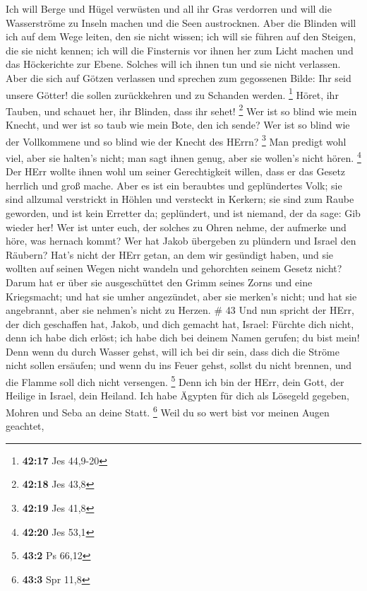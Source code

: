  Ich will Berge und Hügel verwüsten und all ihr Gras
verdorren und will die Wasserströme zu Inseln machen und die Seen
austrocknen.  Aber die Blinden will ich auf dem Wege
leiten, den sie nicht wissen; ich will sie führen auf den Steigen, die
sie nicht kennen; ich will die Finsternis vor ihnen her zum Licht machen
und das Höckerichte zur Ebene. Solches will ich ihnen tun und sie nicht
verlassen.  Aber die sich auf Götzen verlassen und sprechen
zum gegossenen Bilde: Ihr seid unsere Götter! die sollen zurückkehren
und zu Schanden werden. \footnote{\textbf{42:17} Jes 44,9-20}
 Höret, ihr Tauben, und schauet her, ihr Blinden, dass ihr
sehet! \footnote{\textbf{42:18} Jes 43,8}  Wer ist so blind
wie mein Knecht, und wer ist so taub wie mein Bote, den ich sende? Wer
ist so blind wie der Vollkommene und so blind wie der Knecht des HErrn?
\footnote{\textbf{42:19} Jes 41,8}  Man predigt wohl viel,
aber sie halten's nicht; man sagt ihnen genug, aber sie wollen's nicht
hören. \footnote{\textbf{42:20} Jes 53,1}  Der HErr wollte
ihnen wohl um seiner Gerechtigkeit willen, dass er das Gesetz herrlich
und groß mache.  Aber es ist ein beraubtes und geplündertes
Volk; sie sind allzumal verstrickt in Höhlen und versteckt in Kerkern;
sie sind zum Raube geworden, und ist kein Erretter da; geplündert, und
ist niemand, der da sage: Gib wieder her!  Wer ist unter
euch, der solches zu Ohren nehme, der aufmerke und höre, was hernach
kommt?  Wer hat Jakob übergeben zu plündern und Israel den
Räubern? Hat's nicht der HErr getan, an dem wir gesündigt haben, und sie
wollten auf seinen Wegen nicht wandeln und gehorchten seinem Gesetz
nicht?  Darum hat er über sie ausgeschüttet den Grimm
seines Zorns und eine Kriegsmacht; und hat sie umher angezündet, aber
sie merken's nicht; und hat sie angebrannt, aber sie nehmen's nicht zu
Herzen. \# 43  Und nun spricht der HErr, der dich geschaffen
hat, Jakob, und dich gemacht hat, Israel: Fürchte dich nicht, denn ich
habe dich erlöst; ich habe dich bei deinem Namen gerufen; du bist mein!
 Denn wenn du durch Wasser gehst, will ich bei dir sein,
dass dich die Ströme nicht sollen ersäufen; und wenn du ins Feuer gehst,
sollst du nicht brennen, und die Flamme soll dich nicht versengen.
\footnote{\textbf{43:2} Ps 66,12}  Denn ich bin der HErr,
dein Gott, der Heilige in Israel, dein Heiland. Ich habe Ägypten für
dich als Lösegeld gegeben, Mohren und Seba an deine Statt. \footnote{\textbf{43:3}
  Spr 11,8}  Weil du so wert bist vor meinen Augen geachtet,
